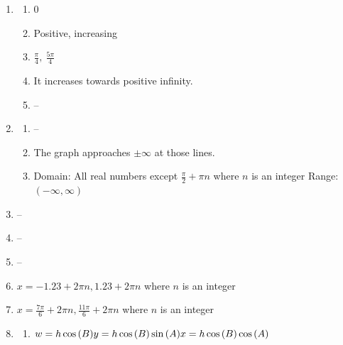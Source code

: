 \documentclass{article}
\begin{document}
\begin{enumerate}
\begin{enumerate}
	\end{enumerate}
	
\item

	\begin{enumerate}
	
	\item 0
	
	\item Positive, increasing
	
	\item $\frac{\pi}{4}, \ \frac{5\pi}{4}$
	
	\item It increases towards positive infinity.
	
	\item --
	
	\end{enumerate}
	
\item

	\begin{enumerate}
	
	\item --
	
	\item The graph approaches $\pm \infty$ at those lines.
	
	\item Domain: All real numbers except $\frac{\pi}{2} + \pi n$ where $n$ is an integer \newline
		Range: $(-\infty, \infty)$
	
	\end{enumerate}

\item --

\item --

\item --
	
\item $x = -1.23 + 2\pi n, 1.23 + 2\pi n$ where $n$ is an integer

\item $x = \frac{7\pi}{6} + 2\pi n, \frac{11\pi}{6} + 2 \pi n$ where $n$ is an integer

\item 

	\begin{enumerate}
	
	\item	$w = h\cos{(B)} \newline
		y = h\cos{(B)}\sin{(A)} \newline
		x = h\cos{(B)}\cos{(A)}$
		

\end{enumerate}
\end{enumerate}
\end{document}

